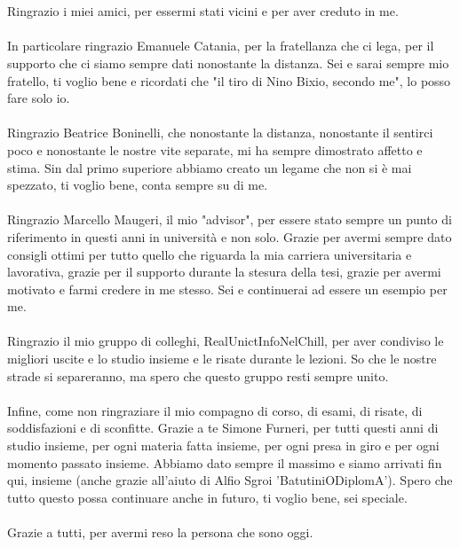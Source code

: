 \\\\Ringrazio i miei amici, per essermi stati vicini e per aver creduto in me.
\\\\In particolare ringrazio Emanuele Catania, per la fratellanza che ci lega, per il supporto che ci siamo sempre dati nonostante la distanza. Sei e sarai sempre mio fratello, ti voglio bene e ricordati che "il tiro di Nino Bixio, secondo me", lo posso fare solo io.
\\\\Ringrazio Beatrice Boninelli, che nonostante la distanza, nonostante il sentirci poco e nonostante le nostre vite separate, mi ha sempre dimostrato affetto e stima. Sin dal primo superiore abbiamo creato un legame che non si è mai spezzato, ti voglio bene, conta sempre su di me.
\\\\Ringrazio Marcello Maugeri, il mio "advisor", per essere stato sempre un punto di riferimento in questi anni in università e non solo. Grazie per avermi sempre dato consigli ottimi per tutto quello che riguarda la mia carriera universitaria e lavorativa, grazie per il supporto durante la stesura della tesi, grazie per avermi motivato e farmi credere in me stesso. Sei e continuerai ad essere un esempio per me.
\\\\Ringrazio il mio gruppo di colleghi, RealUnictInfoNelChill, per aver condiviso le migliori uscite e lo studio insieme e le risate durante le lezioni. So che le nostre strade si separeranno, ma spero che questo gruppo resti sempre unito.
\\\\Infine, come non ringraziare il mio compagno di corso, di esami, di risate, di soddisfazioni e di sconfitte. Grazie a te Simone Furneri, per tutti questi anni di studio insieme, per ogni materia fatta insieme, per ogni presa in giro e per ogni momento passato insieme. Abbiamo dato sempre il massimo e siamo arrivati fin qui, insieme (anche grazie all'aiuto di Alfio Sgroi 'BatutiniODiplomA'). Spero che tutto questo possa continuare anche in futuro, ti voglio bene, sei speciale.
\\\\Grazie a tutti, per avermi reso la persona che sono oggi.